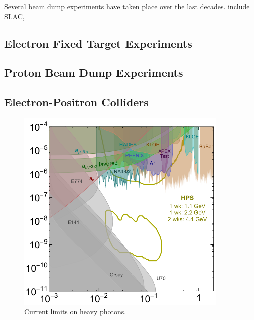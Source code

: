Several beam dump experiments have taken place over the last decades.
include 
SLAC, 

\subsection{Electron Fixed Target Experiments}

\subsection{Proton Beam Dump Experiments}

\subsection{Electron-Positron Colliders}

\begin{figure}[t]
    \centering
    \includegraphics[width=0.9\textwidth]{images/ap_current_limits.png}
    \caption{Current limits on heavy photons.}
    \label{fig:svt_layout_render}
\end{figure}
